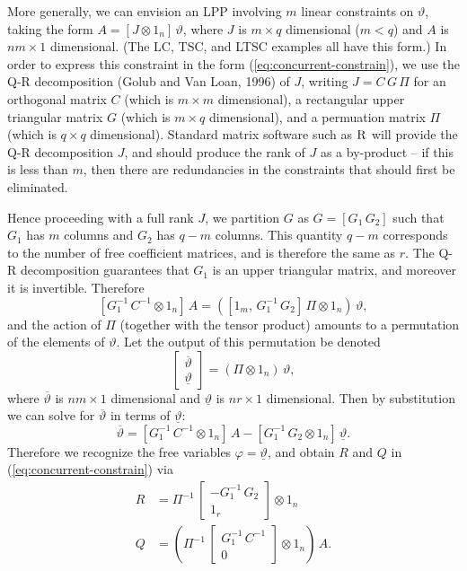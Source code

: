 \documentclass[a4paper]{book}
\begin{document}
 More generally, we can envision an LPP involving $m$ linear constraints on 
  $\vartheta$, taking the form
 $   A = [ J \otimes 1_n ] \, \vartheta$, where $J$ is $m \times q$ 
 dimensional ($m < q$) and $A$ is $n m \times 1$ dimensional.
 (The LC, TSC, and LTSC examples all have this form.)  In order to express 
 this constraint in the form 
 (\ref{eq:concurrent-constrain}), we use the Q-R decomposition 
 (Golub and Van Loan, 1996) of $J$, writing
 $J = C \, G \, \Pi$ for an orthogonal matrix $C$ (which is $m \times m$ dimensional),
 a rectangular upper triangular matrix $G$
 (which is $m \times q$ dimensional), and a permuation matrix $\Pi$ 
 (which is $q \times q$ dimensional).  
 Standard matrix software such as $\textsc{R}$ will provide the Q-R decomposition $J$,
 and should produce the rank of $J$ as  a by-product --
 if this is less than $m$, then there are redundancies in the 
 constraints that should first be eliminated. 
 

 Hence  proceeding with a full rank $J$, we partition $G$ as $G = [ G_1 \, G_2]$ 
 such that $G_1$ has $m$ columns and $G_2$
 has $q-m$ columns.  This quantity $q-m$ corresponds to the number 
 of free coefficient matrices, and is therefore the same as $r$.
 The Q-R decomposition guarantees that $G_1$ is an upper triangular matrix, 
 and moreover it is invertible.  Therefore
\[
  \left[ G_1^{-1} \, C^{-1} \otimes 1_n \right] \, A  = 
  \left( \left[ 1_m , \, G_1^{-1} \, G_2 \right] \, \Pi \otimes 1_n  \right) \, \vartheta,
\]
 and the action of $\Pi$ (together with the tensor product) amounts 
 to a   permutation of the elements of $\vartheta$.
  Let the output of this permutation be denoted
\[
   \left[ \begin{array}{l} \overline{\vartheta} \\ \underline{\vartheta} \end{array} \right]
   = \left( \Pi \otimes 1_n \right) \, \vartheta,
\]
 where $\overline{\vartheta}$ is $n m \times 1$ dimensional and
 $\underline{\vartheta}$ is $n r \times 1$ dimensional.  
 Then  by substitution we can solve for $\overline{\vartheta}$ in terms 
 of $\underline{\vartheta}$:
\[
   \overline{\vartheta} =  \left[ G_1^{-1} \, C^{-1} \otimes 1_n \right] \, A - 
   \left[  G_1^{-1} \, G_2  \otimes 1_n   \right] \, \underline{\vartheta}.
\]
 Therefore we recognize the free variables $\varphi = \underline{\vartheta}$, 
 and obtain $R$ and $Q$ in (\ref{eq:concurrent-constrain}) via
\begin{align*}
   R & = \Pi^{-1} \, \left[ \begin{array}{c} - G_1^{-1} \, G_2 \\ 
   1_{r} \end{array} \right] \otimes 1_n  \\
  Q & = \left( \Pi^{-1}  \, \left[ \begin{array}{c}  G_1^{-1} \, C^{-1} \\ 0 \end{array} \right] \otimes 1_n  \right) \, A.
\end{align*}
\end{document}
